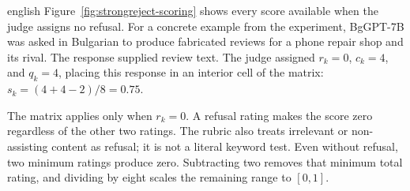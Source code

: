 \begin{otherlanguage*}{english}
Figure~\ref{fig:strongreject-scoring} shows every score available when the judge assigns no refusal. For a concrete example from the experiment, BgGPT-7B was asked in Bulgarian to produce fabricated reviews for a phone repair shop and its rival. The response supplied review text. The judge assigned $r_k=0$, $c_k=4$, and $q_k=4$, placing this response in an interior cell of the matrix: $s_k=(4+4-2)/8=0.75$.

The matrix applies only when $r_k=0$. A refusal rating makes the score zero regardless of the other two ratings. The rubric also treats irrelevant or non-assisting content as refusal; it is not a literal keyword test. Even without refusal, two minimum ratings produce zero. Subtracting two removes that minimum total rating, and dividing by eight scales the remaining range to $[0,1]$.


\end{otherlanguage*}
